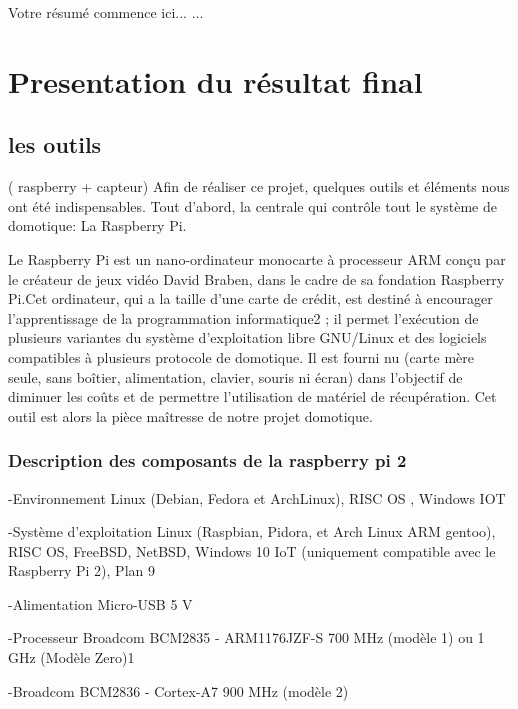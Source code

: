   Votre résumé commence ici...
   ...


\newpage
\tableofcontents
\clearpage

%
\section*{Presentation du résultat final}
\subsection*{les outils} ( raspberry + capteur) 
Afin de réaliser ce projet, quelques outils et éléments nous ont été indispensables. Tout d'abord, la centrale qui contrôle tout le système de domotique: La Raspberry Pi.

Le Raspberry Pi est un nano-ordinateur monocarte à processeur ARM conçu par le créateur de jeux vidéo David Braben, dans le cadre de sa fondation Raspberry Pi.Cet ordinateur, qui a la taille d'une carte de crédit, est destiné à encourager l'apprentissage de la programmation informatique2 ; il permet l'exécution de plusieurs variantes du système d'exploitation libre GNU/Linux et des logiciels compatibles à plusieurs protocole de domotique. Il est fourni nu (carte mère seule, sans boîtier, alimentation, clavier, souris ni écran) dans l'objectif de diminuer les coûts et de permettre l'utilisation de matériel de récupération. Cet outil est alors la pièce maîtresse de notre projet domotique. 
\subsubsection{Description des composants de la raspberry pi 2}
-Environnement 	Linux (Debian, Fedora et ArchLinux), RISC OS , Windows IOT


-Système d'exploitation 	Linux (Raspbian, Pidora, et Arch Linux ARM gentoo), RISC OS, FreeBSD, NetBSD, Windows 10 IoT (uniquement compatible avec le Raspberry Pi 2), Plan 9


-Alimentation 	Micro-USB 5 V


-Processeur 	Broadcom BCM2835 - ARM1176JZF-S 700 MHz (modèle 1) ou 1 GHz (Modèle Zero)1


-Broadcom BCM2836 - Cortex-A7 900 MHz (modèle 2)


